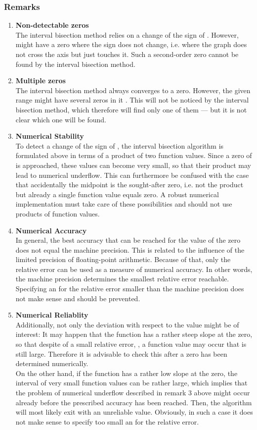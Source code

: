 \documentclass[11pt]{article}
\begin{document}
\subsubsection{Remarks}
\begin{enumerate}
\item \textbf {Non-detectable zeros}\\
The interval bisection method relies on a change of the sign of . However, might have a zero where the sign does not change, i.e. where the graph does not cross the axis but just touches it. Such a second-order zero cannot be found by the interval bisection method.
\item \textbf {Multiple zeros}\\
The interval bisection method always converges to a zero. However, the given range might have several zeros in it . This will not be noticed by the interval bisection method, which therefore will find only one of them — but it is not clear which one will be found.
\item \textbf {Numerical Stability}\\
To detect a change of the sign of , the interval bisection algorithm is formulated above in terms of a product of two function values. Since a zero of is approached, these values can become very small, so that their product may lead to numerical underflow. This can furthermore be confused with the case that accidentally the midpoint is the sought-after zero, i.e. not the product but already a single function value equals zero. A robust numerical implementation must take care of these possibilities and should not use products of function values.
\item \textbf {Numerical Accuracy}\\
In general, the best accuracy that can be reached for the value of the zero does not equal the machine precision. This is related to the influence of the limited precision of floating-point arithmetic. Because of that, only the relative error can be used as a measure of numerical accuracy. In other words, the machine precision determines the smallest relative error reachable. Specifying an for the relative error smaller than the machine precision does not make sense and should be prevented. \\
\item \textbf {Numerical Reliablity}\\
Additionally, not only the deviation with respect to the value might be of interest: It may happen that the function has a rather steep slope at the zero, so that despite of a small relative error, , a function value may occur that is still large. Therefore it is advisable to check this after a zero has been determined numerically. \\
On the other hand, if the function has a rather low slope at the zero, the interval of very small function values can be rather large, which implies that the problem of numerical underflow described in remark 3 above might occur already before the prescribed accuracy has been reached. Then, the algorithm will most likely exit with an unreliable value. Obviously, in such a case it does not make sense to specify too small an for the relative error.
\end{enumerate}
\end{document}
